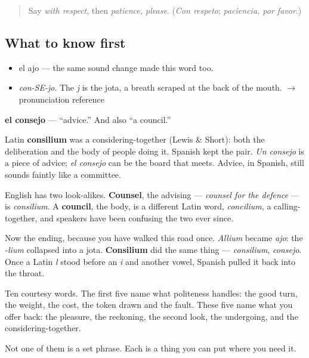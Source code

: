 \label{lesson:ES-C321-consejo}



\begin{quote}
Say \emph{with respect}, then \emph{patience, please}. (\emph{Con respeto}; \emph{paciencia, por favor}.)
\end{quote}

\subsection*{What to know first}
\begin{itemize}
\raggedright
  \item el ajo — the same sound change made this word too.
\end{itemize}

\begin{sounds}
\begin{itemize}
\raggedright
  \item \emph{con-SE-jo}. The \emph{j} is the jota, a breath scraped at the back of the mouth. $\to$ pronunciation reference
\end{itemize}
\end{sounds}

\begin{cousinweb}
\textbf{el consejo} — \textquotedblleft{}advice.\textquotedblright{} And also \textquotedblleft{}a council.\textquotedblright{}

Latin \textbf{consilium} was a considering-together (Lewis \& Short): both the deliberation and the body of people doing it. Spanish kept the pair. \emph{Un consejo} is a piece of advice; \emph{el consejo} can be the board that meets. Advice, in Spanish, still sounds faintly like a committee.

English has two look-alikes. \textbf{Counsel}, the advising — \emph{counsel for the defence} — is \emph{consilium}. A \textbf{council}, the body, is a different Latin word, \emph{concilium}, a calling-together, and speakers have been confusing the two ever since.

Now the ending, because you have walked this road once. \emph{Allium} became \emph{ajo}: the \emph{-lium} collapsed into a jota. \textbf{Consilium} did the same thing — \emph{consilium}, \emph{consejo}. Once a Latin \emph{l} stood before an \emph{i} and another vowel, Spanish pulled it back into the throat.
\end{cousinweb}

\begin{grammarlens}[title={What you've built}]
Ten courtesy words. The first five name what politeness handles: the good turn, the weight, the cost, the token drawn and the fault. These five name what you offer back: the pleasure, the reckoning, the second look, the undergoing, and the considering-together.

Not one of them is a set phrase. Each is a thing you can put where you need it.
\end{grammarlens}

